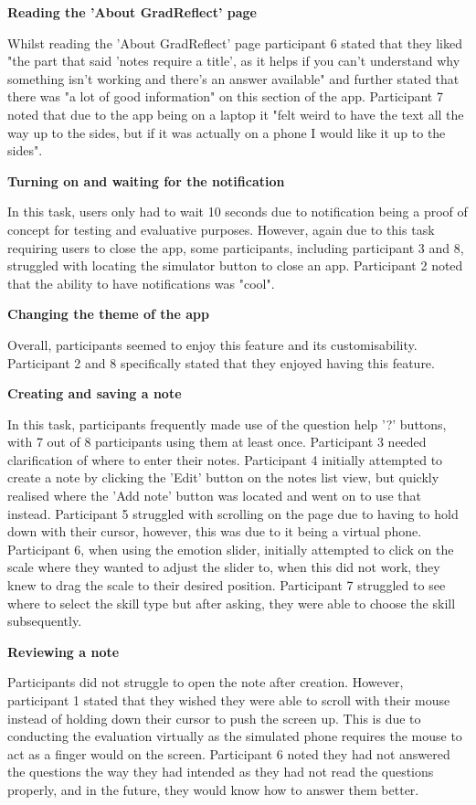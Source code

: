 \documentclass{l4proj}
\begin{document}
\textbf{Reading the 'About GradReflect' page}

Whilst reading the 'About GradReflect' page participant 6 stated that they liked "the part that said 'notes require a title', as it helps if you can't understand why something isn't working and there's an answer available" and further stated that there was "a lot of good information" on this section of the app. Participant 7 noted that due to the app being on a laptop it "felt weird to have the text all the way up to the sides, but if it was actually on a phone I would like it up to the sides".

\textbf{Turning on and waiting for the notification}

In this task, users only had to wait 10 seconds due to notification being a proof of concept for testing and evaluative purposes. However, again due to this task requiring users to close the app, some participants, including participant 3 and 8, struggled with locating the simulator button to close an app. Participant 2 noted that the ability to have notifications was "cool".

\textbf{Changing the theme of the app}

Overall, participants seemed to enjoy this feature and its customisability. Participant 2 and 8 specifically stated that they enjoyed having this feature.


\textbf{Creating and saving a note}

In this task, participants frequently made use of the question help '?' buttons, with 7 out of 8 participants using them at least once. Participant 3 needed clarification of where to enter their notes. Participant 4 initially attempted to create a note by clicking the 'Edit' button on the notes list view, but quickly realised where the 'Add note' button was located and went on to use that instead. Participant 5 struggled with scrolling on the page due to having to hold down with their cursor, however, this was due to it being a virtual phone. Participant 6, when using the emotion slider, initially attempted to click on the scale where they wanted to adjust the slider to, when this did not work, they knew to drag the scale to their desired position. Participant 7 struggled to see where to select the skill type but after asking, they were able to choose the skill subsequently.

\textbf{Reviewing a note}

Participants did not struggle to open the note after creation. However, participant 1 stated that they wished they were able to scroll with their mouse instead of holding down their cursor to push the screen up. This is due to conducting the evaluation virtually as the simulated phone requires the mouse to act as a finger would on the screen. Participant 6 noted they had not answered the questions the way they had intended as they had not read the questions properly, and in the future, they would know how to answer them better.
\end{document}
